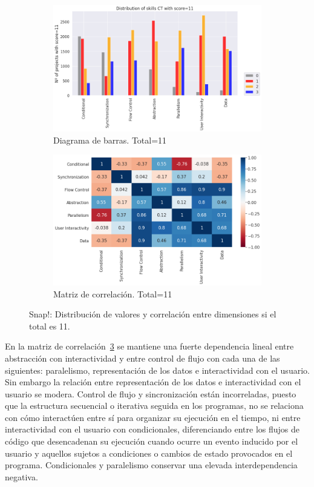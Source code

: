 \documentclass[a4paper, 12pt]{book}
\begin{document}
\begin{figure}[H]
    \centering
    \begin{subfigure}[h]{.49\textwidth} 
        \includegraphics[width=\textwidth]{img/distribucion_11_Snap}
        \caption{Diagrama de barras. Total=11}
        \label{fig:total11_Snap}
    \end{subfigure}       
    \begin{subfigure}[h]{.49\textwidth} 
        \includegraphics[width=\textwidth]{img/corr_11_Snap}
        \caption{Matriz de correlación. Total=11}
        \label{fig:corr11_Snap}
    \end{subfigure}
    \caption{Snap!: Distribución de valores y correlación entre dimensiones si el total es 11.}
\end{figure}

En la matriz de correlación~\ref{fig:corr11_Snap} se mantiene una fuerte dependencia lineal entre abstracción con interactividad y entre control de flujo con cada una de las siguientes: paralelismo, representación de los datos e interactividad con el usuario. Sin embargo la relación entre representación de los datos e interactividad con el usuario se modera. Control de flujo y sincronización están incorreladas, puesto que la estructura secuencial o iterativa seguida en los programas, no se relaciona con cómo interactúen entre sí para organizar su ejecución en el tiempo, ni entre interactividad con el usuario con condicionales, diferenciando entre los flujos de código que desencadenan su ejecución cuando ocurre un evento inducido por el usuario y aquellos sujetos a condiciones o cambios de estado provocados en el programa. Condicionales y paralelismo conservar una elevada interdependencia negativa.
\end{document}
